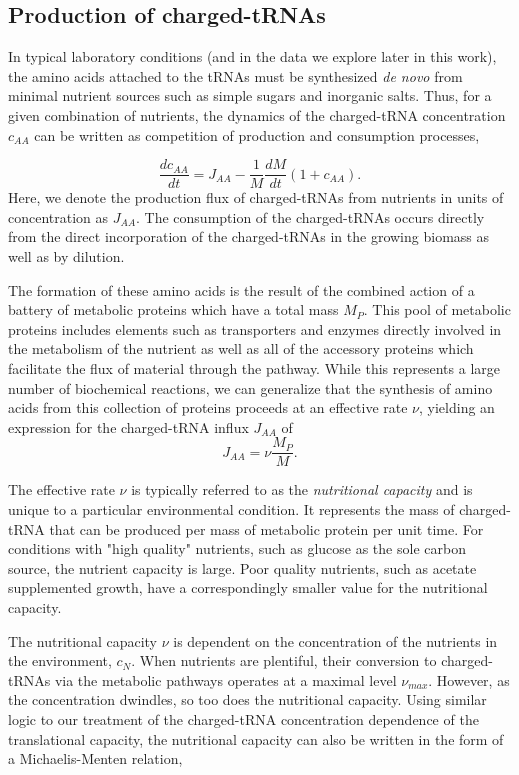 \subsection*{Production of charged-tRNAs}
In typical laboratory conditions (and in the data we explore later in this work), 
the amino acids attached to the tRNAs must be synthesized \textit{de novo} from 
minimal nutrient sources such as simple sugars and inorganic salts. Thus, for a 
given combination of nutrients, the dynamics of the charged-tRNA concentration $c_{AA}$ 
can be written as competition of production and consumption processes,

\begin{equation}
   \frac{dc_{AA}}{dt} = J_{AA} - \frac{1}{M}\frac{dM}{dt}(1 + c_{AA}). \label{eq:caa_dynamics_flux}
\end{equation}
Here, we denote the production flux of charged-tRNAs from nutrients in units of concentration 
as $J_{AA}$. The consumption of the charged-tRNAs occurs directly from the direct incorporation 
of the charged-tRNAs in the growing biomass as well as by dilution.

The formation of these amino acids is the result of the combined action of a battery of metabolic 
proteins which have a total mass $M_P$. This pool of metabolic proteins includes 
elements such as transporters and enzymes directly involved in the metabolism of the 
nutrient as well as all of the accessory proteins which facilitate the flux of 
material through the pathway. While this represents a large number of biochemical 
reactions, we can generalize that the synthesis of amino acids from this collection 
of proteins proceeds at an effective rate $\nu$, yielding an expression for the 
charged-tRNA influx $J_{AA}$ of 
\begin{equation}
J_{AA} = \nu \frac{M_P}{M}. \label{eq:influx}
\end{equation}

The effective rate $\nu$ is typically referred to as the \textit{nutritional capacity} 
and is unique to a particular environmental condition. It represents the mass of 
charged-tRNA that can be produced per mass of metabolic protein per unit time. For
conditions with "high quality" nutrients, such as glucose as the sole carbon source, 
the nutrient capacity is large. Poor quality nutrients, such as acetate supplemented
growth, have a correspondingly smaller value for the nutritional capacity. 

The nutritional capacity 
$\nu$ is  dependent on the concentration of the nutrients in the environment, $c_N$.
When nutrients are plentiful, their conversion to charged-tRNAs via the metabolic 
pathways operates at a maximal level $\nu_{max}$. However, as the concentration 
dwindles, so too does the nutritional capacity. Using similar logic to our treatment 
of the charged-tRNA concentration dependence of the translational capacity,  the 
nutritional capacity can also be written in the form of a Michaelis-Menten relation,

